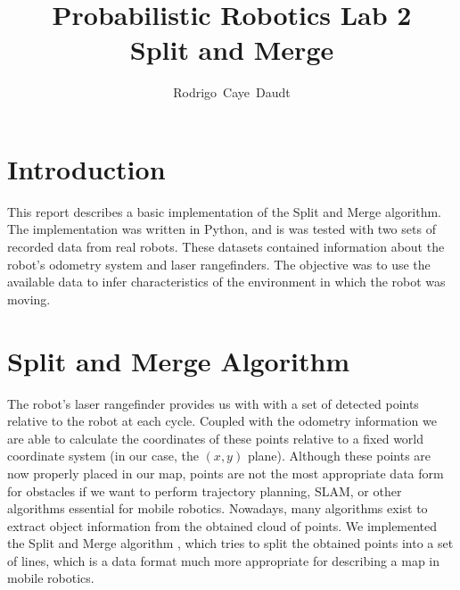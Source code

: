 \documentclass[11pt,oneside,a4paper]{article}
\begin{document}
\title{Probabilistic Robotics Lab 2 \\ Split and Merge}
%
%
\author{Rodrigo~Caye~Daudt}



\maketitle







\section{Introduction}
 
This report describes a basic implementation of the Split and Merge algorithm. The implementation was written in Python, and is was tested with two sets of recorded data from real robots. These datasets contained information about the robot's odometry system and laser rangefinders. The objective was to use the available data to infer characteristics of the environment in which the robot was moving.


\section{Split and Merge Algorithm}\label{doh}

The robot's laser rangefinder provides us with with a set of detected points relative to the robot at each cycle. Coupled with the odometry information we are able to calculate the coordinates of these points relative to a fixed world coordinate system (in our case, the $(x,y)$ plane). Although these points are now properly placed in our map, points are not the most appropriate data form for obstacles if we want to perform trajectory planning, SLAM, or other algorithms essential for mobile robotics. Nowadays, many algorithms exist to extract object information from the obtained cloud of points. We implemented the Split and Merge algorithm \cite{nguyen2005comparison}, which tries to split the obtained points into a set of lines, which is a data format much more appropriate for describing a map in mobile robotics.
\end{document}
